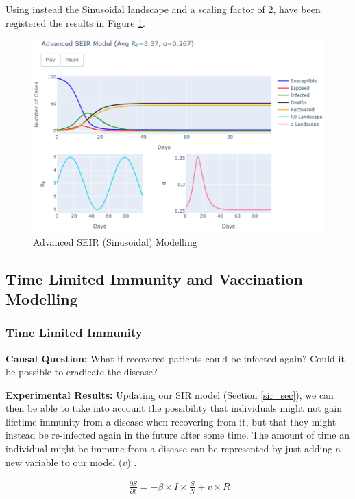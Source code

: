 Using instead the Sinusoidal landscape and a scaling factor of 2, have been registered the results in Figure \ref{sine_seir}.

\begin{figure}[ht!]%
    \centering
    \includegraphics[width=1\linewidth]{latex/images/sine_seir.pdf}
    \caption{Advanced SEIR (Sinusoidal) Modelling}
    \vspace{-0.5cm}
    \label{sine_seir}
\end{figure}

\subsection{Time Limited Immunity and Vaccination Modelling}
\vspace{-0.1cm}
\subsubsection{Time Limited Immunity}
\textbf{Causal Question:} What if recovered patients could be infected again? Could it be possible to eradicate the disease?

\textbf{Experimental Results:} Updating our SIR model (Section \ref{sir_sec}), we can then be able to take into account the possibility that individuals might not gain lifetime immunity from a disease when recovering from it, but that they might instead be re-infected again in the future after some time. The amount of time an individual might be immune from a disease can be represented by just adding a new variable to our model ($v$) \cite{immune}.

\useshortskip
\begin{align}
\ \frac{\partial S}{\partial t} = -\beta \times I \times \frac{S}{N} + v \times R
\end{align}
\useshortskip

